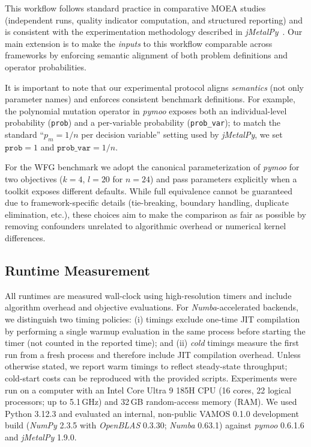 \documentclass[final,5p,times,twocolumn]{elsarticle}
\newcommand{\VAMOS}{VAMOS}
\begin{document}
This workflow follows standard practice in comparative MOEA studies (independent runs, quality indicator computation, and structured reporting) and is consistent with the experimentation methodology described in \textit{jMetalPy}~\cite{BNG+19}. Our main extension is to make the \emph{inputs} to this workflow comparable across frameworks by enforcing semantic alignment of both problem definitions and operator probabilities.

It is important to note that our experimental protocol aligns \emph{semantics} (not only parameter names) and enforces consistent benchmark definitions. For example, the polynomial mutation operator in \textit{pymoo} exposes both an individual-level probability (\texttt{prob}) and a per-variable probability (\texttt{prob\_var}); to match the standard ``$p_m=1/n$ per decision variable'' setting used by \textit{jMetalPy}, we set $\texttt{prob}=1$ and $\texttt{prob\_var}=1/n$.

For the WFG benchmark we adopt the canonical parameterization of \textit{pymoo} for two objectives ($k=4$, $l=20$ for $n=24$) and pass parameters explicitly when a toolkit exposes different defaults. While full equivalence cannot be guaranteed due to framework-specific details (tie-breaking, boundary handling, duplicate elimination, etc.), these choices aim to make the comparison as fair as possible by removing confounders unrelated to algorithmic overhead or numerical kernel differences.


\subsection{Runtime Measurement}

All runtimes are measured  wall-clock  using high-resolution timers and include algorithm overhead and objective evaluations. For \textit{Numba}-accelerated backends, we distinguish two timing policies: (i)  timings exclude one-time JIT compilation by performing a single warmup evaluation in the same process before starting the timer (not counted in the reported time); and (ii) \textit{cold} timings measure the first run from a fresh process and therefore include JIT compilation overhead. Unless otherwise stated, we report warm timings to reflect steady-state throughput; cold-start costs can be reproduced with the provided scripts. Experiments were run on a computer with an Intel Core Ultra 9 185H CPU (16 cores, 22 logical processors; up to 5.1\,GHz) and 32\,GB random-access memory (RAM). We used Python 3.12.3 and evaluated an internal, non-public \VAMOS{} 0.1.0 development build (\textit{NumPy} 2.3.5 with \textit{OpenBLAS} 0.3.30; \textit{Numba} 0.63.1) against \textit{pymoo} 0.6.1.6 and \textit{jMetalPy} 1.9.0.
\end{document}
